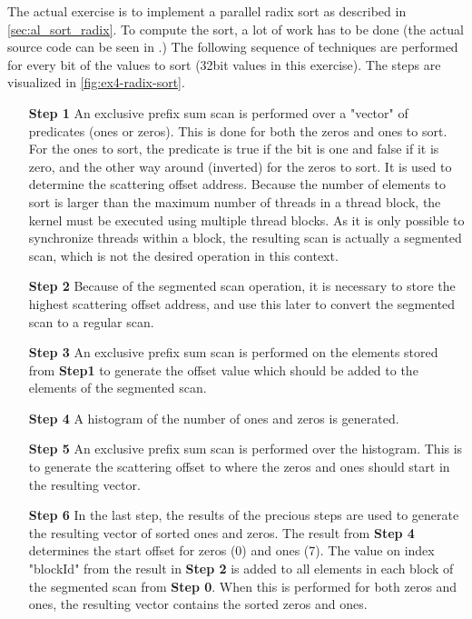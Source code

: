\noindent The actual exercise is to implement a parallel radix sort as described in \autoref{sec:al_sort_radix}.
To compute the sort, a lot of work has to be done (the actual source code can be seen in \cite{exercises}.)
The following sequence of techniques are performed for every bit of the values to sort (32bit values in this exercise).
The steps are visualized in \autoref{fig:ex4-radix-sort}.
\begin{enumerate}
	\item[\textbf{Step 1}]
	An exclusive prefix sum scan is performed over a "vector" of predicates (ones or zeros).
	This is done for both the zeros and ones to sort.
	For the ones to sort, the predicate is true if the bit is one and false if it is zero, and the other way around (inverted) for the zeros to sort.
	It is used to determine the scattering offset address.
	Because the number of elements to sort is larger than the maximum number of threads in a thread block, the kernel must be executed using multiple thread blocks.
	As it is only possible to synchronize threads within a block, the resulting scan is actually a segmented scan, which is not the desired operation in this context.
	\item[\textbf{Step 2}]
	Because of the segmented scan operation, it is necessary to store the highest scattering offset address, and use this later to convert the segmented scan to a regular scan. 
	\item[\textbf{Step 3}]
	An exclusive prefix sum scan is performed on the elements stored from \textbf{Step1} to generate the offset value which should be added to the elements of the segmented scan.
	\item[\textbf{Step 4}]
	A histogram of the number of ones and zeros is generated.
	\item[\textbf{Step 5}]
	An exclusive prefix sum scan is performed over the histogram.
	This is to generate the scattering offset to where the zeros and ones should start in the resulting vector.
	\item[\textbf{Step 6}]
	In the last step, the results of the precious steps are used to generate the resulting vector of sorted ones and zeros.
	The result from \textbf{Step 4} determines the start offset for zeros (0) and ones (7).	
	The value on index "blockId" from the result in \textbf{Step 2} is added to all elements in each block of the segmented scan from \textbf{Step 0}.
	When this is performed for both zeros and ones, the resulting vector contains the sorted zeros and ones.
\end{enumerate}
